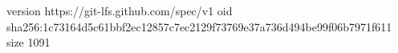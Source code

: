 version https://git-lfs.github.com/spec/v1
oid sha256:1c73164d5c61bbf2ec12857c7ec2129f73769e37a736d494be99f06b7971f611
size 1091
